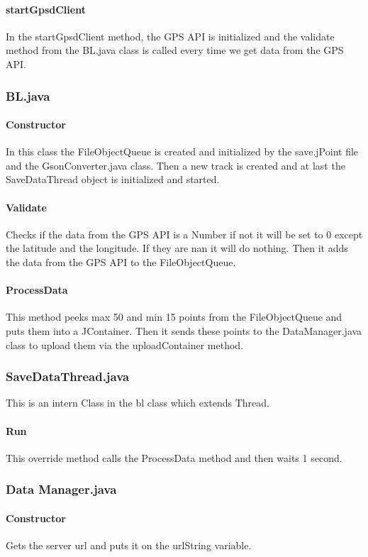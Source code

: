 \paragraph{startGpsdClient}
In the startGpsdClient method, the GPS API is initialized and the validate method from the BL.java class is called every time we get data from the GPS API.
\subsubsection{BL.java}
\paragraph{Constructor}
In this class the FileObjectQueue is created and initialized by the save.jPoint file and the GsonConverter.java class. 
Then a new track is created and at last the SaveDataThread object is initialized and started.
\paragraph{Validate}
Checks if the data from the GPS API is a Number if not it will be set to 0 except the latitude and the longitude. If they are \gls{nan} it will do nothing. 
Then it adds the data from the GPS API to the FileObjectQueue.
\paragraph{ProcessData}
This method peeks max 50 and min 15 points from the FileObjectQueue and puts them into a JContainer. Then it sends these points to the DataManager.java class to upload them via the uploadContainer method.
\subsubsection{SaveDataThread.java}
This is an intern Class in the \gls{bl} class which extends Thread.
\paragraph{Run}
This override method calls the ProcessData method and then waits 1 second.
\subsubsection{Data Manager.java}
\paragraph{Constructor}
Gets the server \gls{url} and puts it on the urlString variable.
